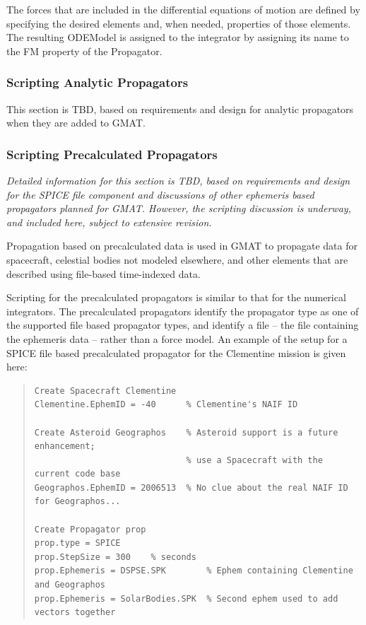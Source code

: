 \noindent The forces that are included in the differential equations of motion are defined by
specifying the desired elements and, when needed, properties of those elements.  The resulting
ODEModel is assigned to the integrator by assigning its name to the FM property of the Propagator.

\subsubsection{Scripting Analytic Propagators}

This section is TBD, based on requirements and design for analytic propagators when they are added
to GMAT.

\subsubsection{Scripting Precalculated Propagators}

\textit{Detailed information for this section is TBD, based on requirements and design for the SPICE
file component and discussions of other ephemeris based propagators planned for GMAT.  However, the
scripting discussion is underway, and included here, subject to extensive revision.}

Propagation based on precalculated data is used in GMAT to propagate data for spacecraft, celestial
bodies not modeled elsewhere, and other elements that are described using file-based time-indexed
data.

Scripting for the precalculated propagators is similar to that for the numerical integrators.  The
precalculated propagators identify the propagator type as one of the supported file based propagator
types, and identify a file -- the file containing the ephemeris data -- rather than a force model.
An example of the setup for a SPICE file based precalculated propagator for the Clementine mission
is given here:

\begin{quote}
\begin{verbatim}
Create Spacecraft Clementine
Clementine.EphemID = -40      % Clementine's NAIF ID

Create Asteroid Geographos    % Asteroid support is a future enhancement;
                              % use a Spacecraft with the current code base
Geographos.EphemID = 2006513  % No clue about the real NAIF ID for Geographos...

Create Propagator prop
prop.type = SPICE
prop.StepSize = 300    % seconds
prop.Ephemeris = DSPSE.SPK        % Ephem containing Clementine and Geographos
prop.Ephemeris = SolarBodies.SPK  % Second ephem used to add vectors together
\end{verbatim}
\end{quote}

